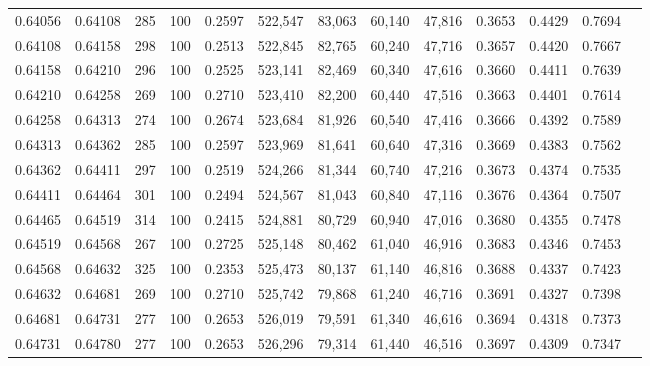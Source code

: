 \begin{tabular}{rrrrrrrrrrrrr}
0.64056 & 0.64108 &   285 & 100 &                                     0.2597 & 522,547 &  83,063 &  60,140 &  47,816 & 0.3653 & 0.4429 & 0.7694 \\
0.64108 & 0.64158 &   298 & 100 &                                     0.2513 & 522,845 &  82,765 &  60,240 &  47,716 & 0.3657 & 0.4420 & 0.7667 \\
0.64158 & 0.64210 &   296 & 100 &                                     0.2525 & 523,141 &  82,469 &  60,340 &  47,616 & 0.3660 & 0.4411 & 0.7639 \\
0.64210 & 0.64258 &   269 & 100 &                                     0.2710 & 523,410 &  82,200 &  60,440 &  47,516 & 0.3663 & 0.4401 & 0.7614 \\
0.64258 & 0.64313 &   274 & 100 &                                     0.2674 & 523,684 &  81,926 &  60,540 &  47,416 & 0.3666 & 0.4392 & 0.7589 \\
0.64313 & 0.64362 &   285 & 100 &                                     0.2597 & 523,969 &  81,641 &  60,640 &  47,316 & 0.3669 & 0.4383 & 0.7562 \\
0.64362 & 0.64411 &   297 & 100 &                                     0.2519 & 524,266 &  81,344 &  60,740 &  47,216 & 0.3673 & 0.4374 & 0.7535 \\
0.64411 & 0.64464 &   301 & 100 &                                     0.2494 & 524,567 &  81,043 &  60,840 &  47,116 & 0.3676 & 0.4364 & 0.7507 \\
0.64465 & 0.64519 &   314 & 100 &                                     0.2415 & 524,881 &  80,729 &  60,940 &  47,016 & 0.3680 & 0.4355 & 0.7478 \\
0.64519 & 0.64568 &   267 & 100 &                                     0.2725 & 525,148 &  80,462 &  61,040 &  46,916 & 0.3683 & 0.4346 & 0.7453 \\
0.64568 & 0.64632 &   325 & 100 &                                     0.2353 & 525,473 &  80,137 &  61,140 &  46,816 & 0.3688 & 0.4337 & 0.7423 \\
0.64632 & 0.64681 &   269 & 100 &                                     0.2710 & 525,742 &  79,868 &  61,240 &  46,716 & 0.3691 & 0.4327 & 0.7398 \\
0.64681 & 0.64731 &   277 & 100 &                                     0.2653 & 526,019 &  79,591 &  61,340 &  46,616 & 0.3694 & 0.4318 & 0.7373 \\
0.64731 & 0.64780 &   277 & 100 &                                     0.2653 & 526,296 &  79,314 &  61,440 &  46,516 & 0.3697 & 0.4309 & 0.7347 \\

\end{tabular}
